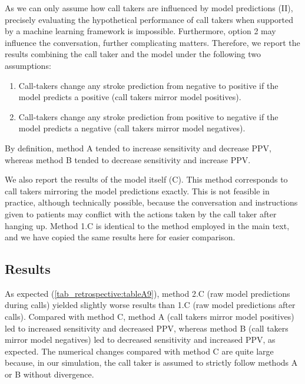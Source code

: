 {As we can only assume how call takers are influenced by model predictions (II), precisely evaluating the hypothetical performance of call takers when supported by a machine learning framework is impossible. Furthermore, option 2 may influence the conversation, further complicating matters. Therefore, we report the results combining the call taker and the model under the following two assumptions:
%
\begin{enumerate}[label=\Alph*.]
    \item Call-takers change any stroke prediction from negative to positive if the model predicts a positive (call takers mirror model positives).
    \item Call-takers change any stroke prediction from positive to negative if the model predicts a negative (call takers mirror model negatives).
\end{enumerate}
%
By definition, method A tended to increase sensitivity and decrease PPV, whereas method B tended to decrease sensitivity and increase PPV.

We also report the results of the model itself (C). This method corresponds to call takers mirroring the model predictions exactly. This is not feasible in practice, although technically possible, because the conversation and instructions given to patients may conflict with the actions taken by the call taker after hanging up. Method 1.C is identical to the method employed in the main text, and we have copied the same results here for easier comparison.


\subsection{Results}

As expected (\cref{tab_retrospective:tableA9}), method 2.C (raw model predictions during calls) yielded slightly worse results than 1.C (raw model predictions after calls). Compared with method C, method A (call takers mirror model positives) led to increased sensitivity and decreased PPV, whereas method B (call takers mirror model negatives) led to decreased sensitivity and increased PPV, as expected. The numerical changes compared with method C are quite large because, in our simulation, the call taker is assumed to strictly follow methods A or B without divergence.

\begin{sidewaystable}[h]
    \centering
    \caption{Overall performance of model, call takers and simulated combinations of model and call takers on MH-1813 test data.}
    \label{tab_retrospective:tableA9}
\end{sidewaystable}}
